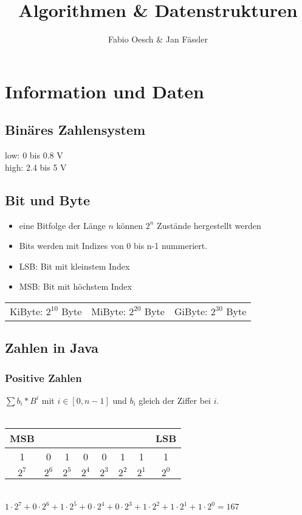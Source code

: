 \documentclass[a4paper,10pt]{article}
\author{Fabio Oesch \& Jan F\"assler}
\title{Algorithmen \& Datenstrukturen}
\begin{document}
\maketitle
\pagebreak
\section{Information und Daten}
\subsection{Bin\"ares Zahlensystem}
low: 0 bis 0.8 V\\
high: 2.4 bis 5 V\\
\subsection{Bit und Byte}
\begin{itemize}
\item eine Bitfolge der L\"ange $n$ k\"onnen $2^n$ Zust\"ande hergestellt werden
\item Bits werden mit Indizes von 0 bis n-1 nummeriert.
\item LSB: Bit mit kleinstem Index
\item MSB: Bit mit h\"ochstem Index
\end{itemize}
\begin{tabular}{l l l }
	KiByte: $2^{10}$ Byte &
	MiByte: $2^{20}$ Byte &
	GiByte: $2^{30}$ Byte
\end{tabular}

\subsection{Zahlen in Java}
\subsubsection{Positive Zahlen}
$\sum {b_i * B^i}$ mit $i \in [0,n-1]$ und $b_i$ gleich der Ziffer bei $i$. \\\\
\begin{tabular}{|c|c|c|c|c|c|c|c|}
\multicolumn{1}{c}{MSB}&\multicolumn{6}{c}{}&\multicolumn{1}{c}{LSB}\\ \hline
1&0&1&0&0&1&1&1\\\hline
\multicolumn{1}{c}{$2^7$}&\multicolumn{1}{c}{$2^6$}&\multicolumn{1}{c}{$2^5$}&\multicolumn{1}{c}{$2^4$}&\multicolumn{1}{c}{$2^3$}&\multicolumn{1}{c}{$2^2$}&\multicolumn{1}{c}{$2^1$}&\multicolumn{1}{c}{$2^0$}\\
\end{tabular}\\
$1\cdot 2^7+0\cdot 2^6+1\cdot 2^5+0\cdot 2^4+0\cdot 2^3+1\cdot 2^2+1\cdot 2^1+1\cdot 2^0=167$
\end{document}
